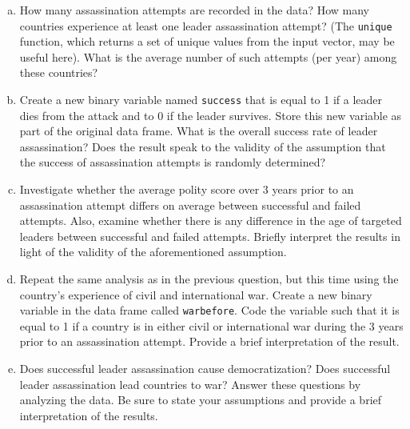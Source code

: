 \documentclass[11pt]{article}
\begin{document}
\begin{enumerate}[a.]
	\item How many assassination attempts are recorded in the data?  How
many countries experience at least one leader assassination attempt?
(The {\tt unique} function, which returns a set of unique values
from the input vector, may be useful here).  What is the average
number of such attempts (per year) among these countries?
	\item Create a new binary variable named {\tt success} that is equal
to 1 if a leader dies from the attack and to 0 if the leader
survives.  Store this new variable as part of the original data
frame.  What is the overall success rate of leader assassination?
Does the result speak to the validity of the assumption that the
success of assassination attempts is randomly determined?
	\item Investigate whether the average polity score over 3 years prior
  to an assassination attempt differs on average between successful
  and failed attempts.  Also, examine whether there is any difference
  in the age of targeted leaders between successful and failed
  attempts.  Briefly interpret the results in light of the validity of
  the aforementioned assumption.
  	\item Repeat the same analysis as in the previous question, but this
  time using the country's experience of civil and international war.
  Create a new binary variable in the data frame called
  {\tt warbefore}.  Code the variable such that it is equal to 1 if
  a country is in either civil or international war during the 3 years
  prior to an assassination attempt.  Provide a brief interpretation
  of the result.
  \item Does successful leader assassination cause democratization?
  Does successful leader assassination lead countries to war?  Answer
  these questions by analyzing the data.  Be sure to state your
  assumptions and provide a brief interpretation of the results.
\end{enumerate}
\end{document}
